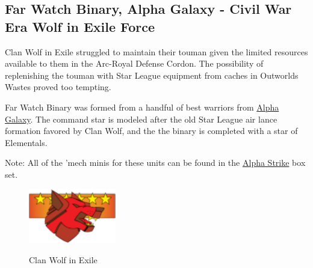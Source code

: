 \subsection{Far Watch Binary, Alpha Galaxy - Civil War Era Wolf in Exile Force}

Clan Wolf in Exile struggled to maintain their touman given the limited resources available to them in the Arc-Royal Defense Cordon.
The possibility of replenishing the touman with Star League equipment from caches in Outworlds Wastes proved too tempting.

Far Watch Binary was formed from a handful of best warriors from \href{https://www.sarna.net/wiki/Alpha_Galaxy_(Clan_Wolf-in-Exile)}{Alpha Galaxy}.
The command star is modeled after the old Star League air lance formation favored by Clan Wolf, and the the binary is completed with a star of Elementals.
          	
Note: All of the 'mech minis for these units can be found in the \href{https://www.sarna.net/wiki/Alpha_Strike_Boxed_Set}{Alpha Strike} box set. 

\begin{figure}[!h]
  \centering
  \includegraphics[alt='Clan Wolf in Exile Logo', width=1.5in, height=0.931in]{img/Wolf.png}
  \caption*{Clan Wolf in Exile}
\end{figure}

